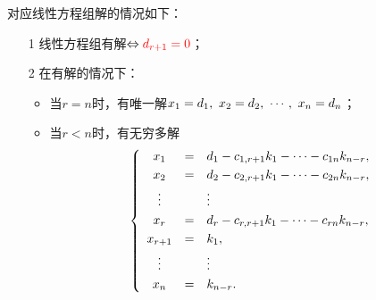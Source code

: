 \begin{frame}

对应线性方程组解的情况如下：   
\begin{itemize}
\item[1] 线性方程组有解$ \Leftrightarrow \textcolor{red}{d_{r+1}=0}$；\\[0.2in]
\item[2] 在有解的情况下：\\[0.1in]
  \begin{itemize}
  \item 当$r=n$时，有唯一解$x_1=d_1,~x_2=d_2,~\cdots,~x_n=d_n$；\\[0.1in]
  \item 当$r<n$时，有无穷多解
    $$
    \left\{
      \begin{array}{ccl}
        x_1 &=& d_1 - c_{1,r+1}k_1 - \cdots - c_{1n}k_{n-r}, \\[0.1cm]
        x_2 &=& d_2 - c_{2,r+1}k_1 - \cdots - c_{2n}k_{n-r}, \\[0.1cm]
        \vdots & & \vdots \\[0.1cm]
        x_r &=& d_r - c_{r,r+1}k_1 - \cdots - c_{rn}k_{n-r}, \\[0.1cm]
        x_{r+1} &=& k_1, \\[0.1cm]
        \vdots && \vdots \\[0.1cm]
        x_{n} &=& k_{n-r}.
      \end{array}
    \right.
    $$
  \end{itemize}
\end{itemize}
\end{frame}